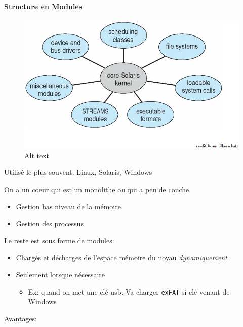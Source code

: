 \paragraph{Structure en Modules}\label{structure-en-modules}

\begin{figure}
\centering
\includegraphics{image-20.png}
\caption{Alt text}
\end{figure}

Utilisé le plus souvent: Linux, Solaris, Windows

On a un coeur qui est un monolithe ou qui a peu de couche.

\begin{itemize}
\tightlist
\item
  Gestion bas niveau de la mémoire
\item
  Gestion des processus
\end{itemize}

Le reste est sous forme de modules:

\begin{itemize}
\tightlist
\item
  Chargés et décharges de l'espace mémoire du noyau \emph{dynamiquement}
\item
  Seulement lorsque nécessaire

  \begin{itemize}
  \tightlist
  \item
    Ex: quand on met une clé usb. Va charger \texttt{exFAT} si clé
    venant de Windows
  \end{itemize}
\end{itemize}

Avantages:

